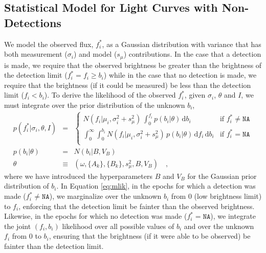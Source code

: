 \documentclass[12pt,preprint]{aastex}
\newcommand{\dd}{\mathrm{d}}
\newcommand{\fobs}{f_i^*}
\begin{document}
\subsection{Statistical Model for Light Curves with Non-Detections}

We model the observed flux, $\fobs$, as a Gaussian distribution with variance that has both measurement ($\sigma_i$) and model ($s_{\mu}$) contributions.  In the case that a detection is made, we require that the observed brightness be greater than the brightness of the detection limit ($\fobs = f_i \ge b_i$) while in the case that no detection is made, we require that the brightness (if it could be measured) be less than the detection limit ($f_i < b_i$).  To derive the likelihood of the observed $\fobs$, given $\sigma_i$, $\theta$ and $I$, we must integrate over the prior distribution of the unknown $b_i$,
\begin{eqnarray}\displaystyle
p(\fobs |\sigma_i,\theta,I) &=& \left\{\begin{array}{ll}
  N(f_i | \mu_i,  \sigma_i^2 + s_{\mu}^2)\,  \int_0^{f_i} p(b_i | \theta)\, \dd b_i & \mbox{if $\fobs \ne \texttt{NA}$} \\
  \int_{0}^{\infty} \int_{0}^{b_i} N(f_i | \mu_i, \sigma_i^2 + s_{\mu}^2)\, p(b_i | \theta)\, \dd f_i\, \dd b_i & \mbox{if $\fobs = \texttt{NA}$} \\
\end{array}\right.\label{eq:mlik}
\\
p(b_i|\theta) &=& N(b_i|B,V_B)
\label{eq:bprior}
\\
\theta &\equiv& (\omega, \{A_k\}, \{B_k\}, s_\mu^2, B, V_B) \quad ,
\end{eqnarray}
where we have introduced the hyperparameters $B$ and $V_B$ for the Gaussian prior distribution of $b_i$.  In Equation \ref{eq:mlik}, in the epochs for which a detection was made ($\fobs \ne \texttt{NA}$), we marginalize over the unknown $b_i$ from $0$ (low brightness limit) to $f_i$, enforcing that the detection limit be fainter than the observed brightness.  Likewise, in the epochs for which no detection was made ($\fobs = \texttt{NA}$), we integrate the joint $(f_i, b_i)$ likelihood over all possible values of $b_i$ and over the unknown $f_i$ from $0$ to $b_i$, ensuring that the brightness (if it were able to be observed) be fainter than the detection limit.
\end{document}
